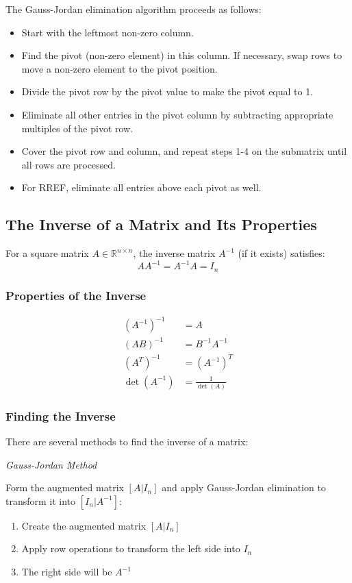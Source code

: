 The Gauss-Jordan elimination algorithm proceeds as follows:
\begin{itemize}[label=\(-\)]
    \item Start with the leftmost non-zero column.
    \item Find the pivot (non-zero element) in this column. If necessary, swap rows to move a non-zero element to the pivot position.
    \item Divide the pivot row by the pivot value to make the pivot equal to 1.
    \item Eliminate all other entries in the pivot column by subtracting appropriate multiples of the pivot row.
    \item Cover the pivot row and column, and repeat steps 1-4 on the submatrix until all rows are processed.
    \item For RREF, eliminate all entries above each pivot as well.
\end{itemize}

\subsection{The Inverse of a Matrix and Its Properties}

For a square matrix \(A \in \mathbb{R}^{n \times n}\), the inverse matrix \(A^{-1}\) (if it exists) satisfies:
\begin{equation*}
A A^{-1} = A^{-1} A = I_n
\end{equation*}

\subsubsection{Properties of the Inverse}
\begin{align*}
{(A^{-1})}^{-1} &= A \\
{(AB)}^{-1} &= B^{-1}A^{-1} \\
{(A^T)}^{-1} &= {(A^{-1})}^T \\
\det(A^{-1}) &= \frac{1}{\det(A)}
\end{align*}

\subsubsection{Finding the Inverse}
There are several methods to find the inverse of a matrix:

\emph{Gauss-Jordan Method} 

Form the augmented matrix \([A|I_n]\) and apply Gauss-Jordan elimination to transform it into \([I_n|A^{-1}]\):
\begin{enumerate}
    \item Create the augmented matrix \([A|I_n]\)
    \item Apply row operations to transform the left side into \(I_n\)
    \item The right side will be \(A^{-1}\)
\end{enumerate}

